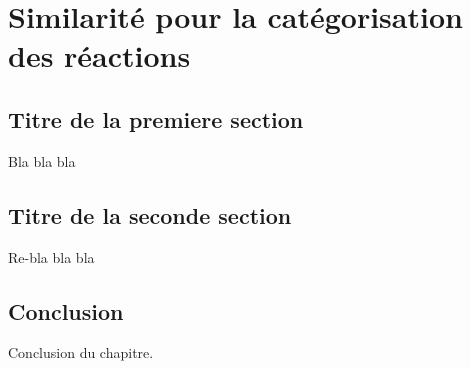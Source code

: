 \chapter{Similarité pour la catégorisation des réactions}
\label{chap5}
\section{Titre de la premiere section}
Bla bla bla
\section{Titre de la seconde section}
Re-bla bla bla

\section{Conclusion}
Conclusion du chapitre.
